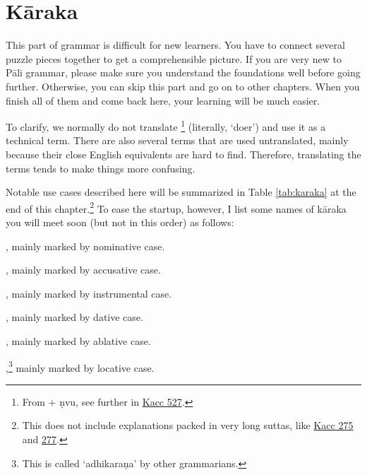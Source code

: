 \chapter{Kāraka}\label{chap:karaka}

This part of grammar is difficult for new learners. You have to connect several puzzle pieces together to get a comprehensible picture. If you are very new to Pāli grammar, please make sure you understand the foundations well before going further. Otherwise, you can skip this part and go on to other chapters. When you finish all of them and come back here, your learning will be much easier.

To clarify, we normally do not translate \footnote{From  + ṇvu, see further in \hyperref[sut:527]{Kacc 527}.} (literally, `doer') and use it as a technical term. There are also several terms that are used untranslated, mainly because their close English equivalents are hard to find. Therefore, translating the terms tends to make things more confusing.

Notable use cases described here will be summarized in Table \ref{tab:karaka} at the end of this chapter.\footnote{This does not include explanations packed in very long suttas, like \hyperref[sut:275]{Kacc 275} and \hyperref[sut:277]{277}.} To ease the startup, however, I list some names of kāraka you will meet soon (but not in this order) as follows:

\begin{compactitem}
\item {}, mainly marked by nominative case.
\item {}, mainly marked by accusative case.
\item {}, mainly marked by instrumental case.
\item {}, mainly marked by dative case.
\item {}, mainly marked by ablative case.
\item {},\footnote{This is called `adhikaraṇa' by other grammarians.} mainly marked by locative case.
\end{compactitem}


